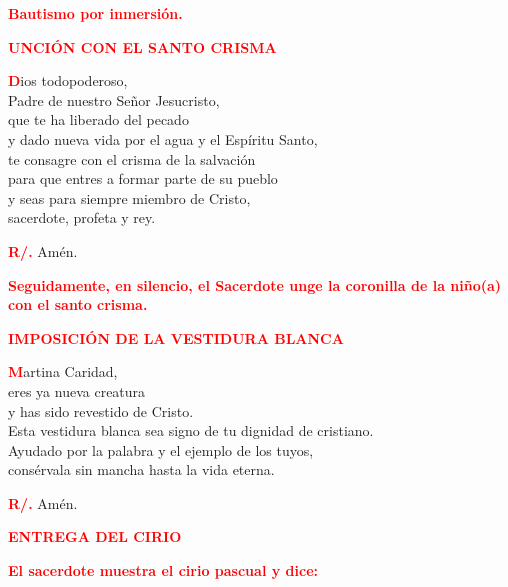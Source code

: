\documentclass[12pt, letterpaper]{report}
\begin{document}
\large {\bfseries \textcolor{red}{Bautismo por inmersi\'on.}} \newline

\Large {\bfseries \textcolor{red}{UNCI\'ON CON EL SANTO CRISMA}}

\lettrine[lines=1]{\bfseries \textcolor{red}{D}}{}\Large ios todopoderoso, \\
Padre de nuestro Se\~nor Jesucristo, \\
que te ha liberado del pecado \\
y dado nueva vida por el agua y el Esp\'iritu Santo, \\
te consagre con el crisma de la salvaci\'on \\
para que entres a formar parte de su pueblo \\
y seas para siempre miembro de Cristo, \\
sacerdote, profeta y rey. \newline

\noindent
\Large {\bfseries \textcolor{red}{R/.}} \hspace{0.5cm} Am\'en. \newline

\large {\bfseries \textcolor{red}{Seguidamente, en silencio, el Sacerdote unge la coronilla de la ni\~no(a) con el santo crisma.}} \newline

\newpage

\Large {\bfseries \textcolor{red}{IMPOSICI\'ON DE LA VESTIDURA BLANCA}}

\lettrine[lines=1]{\bfseries \textcolor{red}{M}}{}\Large artina Caridad, \\
eres ya nueva creatura \\
y has sido revestido de Cristo. \\
Esta vestidura blanca sea signo de tu dignidad de cristiano. \\
Ayudado por la palabra y el ejemplo de los tuyos, \\
cons\'ervala sin mancha hasta la vida eterna. \newline

\noindent
\Large {\bfseries \textcolor{red}{R/.}} \hspace{0.5cm} Am\'en. \newline

\Large {\bfseries \textcolor{red}{ENTREGA DEL CIRIO}} \newline

\large {\bfseries \textcolor{red}{El sacerdote muestra el cirio pascual y dice:}} \newline
\end{document}
